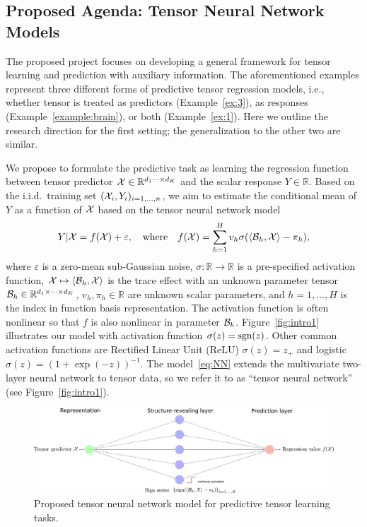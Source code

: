 \documentclass[11pt]{article}
\def\sign{\textup{sgn}}
\theoremstyle{exampstyle}
\theoremstyle{definition}
\def\sign{\textup{sgn}}
\begin{document}
\subsection{Proposed Agenda: Tensor Neural Network Models}
  \vspace{-.3cm}
The proposed project focuses on developing a general framework for tensor learning and prediction with auxiliary information. The aforementioned examples represent three different forms of predictive tensor regression models, i.e., whether tensor is treated as predictors (Example~\ref{ex:3}), as responses (Example~\ref{example:brain}), or both (Example~\ref{ex:1}). Here we outline the research direction for the first setting; the generalization to the other two are similar. 

We propose to formulate the predictive task as learning the regression function between tensor predictor $\mathcal{X}\in\mathbb{R}^{d_1\cdots \times d_K}$ and the scalar response $Y\in\mathbb{R}$. Based on the i.i.d.\ training set $(\mathcal{X}_i, Y_i)_{i=1,\ldots,n}$, we aim to estimate the conditional mean of $Y$ as a function of $\mathcal{X}$ based on the tensor neural network model
\begin{equation}\label{eq:NN}
Y|\mathcal{X}=f(\mathcal{X})+\varepsilon, \quad \text{where}\quad f(\mathcal{X})=\sum_{h=1}^H v_h \sigma(\langle \mathcal{B}_h, \mathcal{X}\rangle-\pi_h),
\end{equation}
where $\varepsilon$ is a zero-mean sub-Gaussian noise, $\sigma\colon \mathbb{R}\to\mathbb{R}$ is a pre-specified activation function, $\mathcal{X}\mapsto\langle \mathcal{B}_h, \mathcal{X} \rangle$ is the trace effect with an unknown parameter tensor $\mathcal{B}_h\in\mathbb{R}^{d_1\times \cdots \times d_K}$, $v_h, \pi_h \in\mathbb{R}$ are unknown scalar parameters, and $h=1,\ldots,H$ is the index in function basis representation. The activation function is often nonlinear so that $f$ is also nonlinear in parameter $\mathcal{B}_h$. Figure~\ref{fig:intro1} illustrates our model with activation function $\sigma(z)=\sign(z)$. Other common activation functions are Rectified Linear Unit (ReLU) $\sigma(z)=z_{+}$ and logistic $\sigma(z)=(1+\exp(-z))^{-1}$. The model~\eqref{eq:NN} extends the multivariate two-layer neural network to tensor data, so we refer it to as ``tensor neural network'' (see Figure~\ref{fig:intro1}).  


\begin{figure}[http]
\begin{center}
\includegraphics[width=.9\textwidth]{ASSIST.pdf}
\caption{Proposed tensor neural network model for predictive tensor learning tasks.}\label{fig:proposal}
\vspace{-.3cm}
\end{center}
\end{figure}
\end{document}
